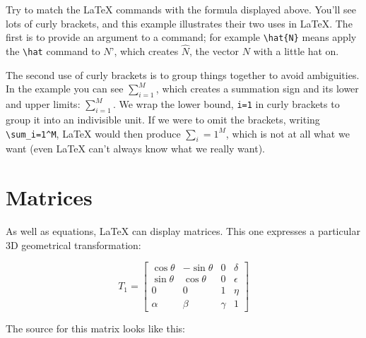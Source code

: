 \documentclass[
]{book}
\begin{document}
Try to match the LaTeX commands with the formula displayed above. You'll see lots of curly brackets, and this example illustrates their two uses in LaTeX. The first is to provide an argument to a command; for example \texttt{\textbackslash{}hat\{N\}} means apply the \texttt{\textbackslash{}hat} command to \(N\)', which creates \(\hat{N}\), the vector \(N\) with a little hat on.

The second use of curly brackets is to group things together to avoid ambiguities. In the example you can see \(\sum_{i=1}^M\), which creates a summation sign and its lower and upper limits: \(\sum_{i=1}^{M}\). We wrap the lower bound, \texttt{i=1} in curly brackets to group it into an indivisible unit. If we were to omit the brackets, writing \texttt{\textbackslash{}sum\_i=1\^{}M}, LaTeX would then produce \(\sum_i=1^M\), which is not at all what we want (even LaTeX can't always know what we really want).

\hypertarget{matrix}{%
\section{Matrices}\label{matrix}}

As well as equations, LaTeX can display matrices. This one expresses a particular 3D geometrical transformation:

\[ T_1 = \left[
 \begin{array}{cccc}
 \cos \theta & -\sin \theta & 0 & \delta \\
 \sin \theta  & \cos \theta & 0 & \epsilon \\
 0 & 0 & 1 & \eta \\
 \alpha & \beta & \gamma & 1
 \end{array}
 \right] \]

The source for this matrix looks like this:
\end{document}
